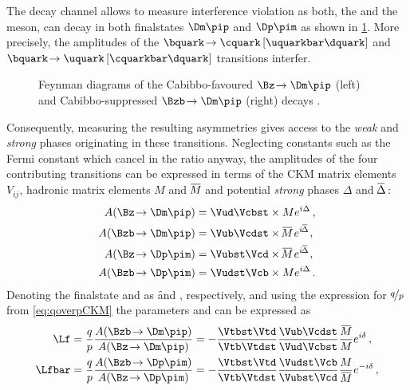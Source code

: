 The decay channel \BdToDpi allows to measure interference \CP violation as both, the \Bz and the \Bzb meson, can decay in both finalstates $\Dm\pip$ and $\Dp\pim$ as shown in \cref{fig:feynmanBd2Dpi}.
More precisely, the amplitudes of the $\bquark\!\to\cquark\left[\uquarkbar\dquark\right]$ and $\bquark\!\to\uquark\left[\cquarkbar\dquark\right]$ transitions interfer.
\begin{figure}[tbp]
	\centering
	
	
	\caption{Feynman diagrams of the Cabibbo-favoured $\Bz\!\to\Dm\pip$ (left) and Cabibbo-suppressed $\Bzb\!\to\Dm\pip$ (right) decays \cite{Ellis:2016jkw}.}
	\label{fig:feynmanBd2Dpi}
\end{figure}
Consequently, measuring the resulting \CP asymmetries gives access to the \emph{weak} and \emph{strong} phases originating in these transitions.
Neglecting constants such as the Fermi constant which cancel in the ratio anyway, the amplitudes of the four contributing transitions can be expressed in terms of the CKM matrix elements $V_{ij}^{\phantom{\ast}}$, hadronic matrix elements $M$ and $\overline{\kern -1.0pt M\kern -1.0pt}$ and potential \emph{strong} phases $\Delta$ and $\overline{\kern -1.0pt \Delta\kern -1.0pt}\,$:
\begin{align}
A\!\left(\Bz\!\to\Dm\pip\right)&=\Vud\Vcbst\times Me^{i\Delta}\,,\\
A\!\left(\Bzb\!\to\Dm\pip\right)&=\Vub\Vcdst\times \overline{\kern -1.0pt M\kern -1.0pt}\,e^{i\overline{\kern -1.0pt \Delta\kern -1.0pt}}\,,\\
A\!\left(\Bz\!\to\Dp\pim\right)&=\Vubst\Vcd\times \overline{\kern -1.0pt M\kern -1.0pt}\,e^{i\overline{\kern -1.0pt \Delta\kern -1.0pt}}\,,\\
A\!\left(\Bzb\!\to\Dp\pim\right)&=\Vudst\Vcb\times Me^{i\Delta}\,.
\end{align}
Denoting the finalstate \Dm\pip and \Dp\pim as \f and \fbar, respectively, and using the expression for $\nicefrac{q}{p}$ from \cref{eq:qoverpCKM} the parameters \Lf and \Lfbar can be expressed as
\begin{align}
\Lf&=\frac{q}{p}\frac{A\!\left(\Bzb\!\to\Dm\pip\right)}{A\!\left(\Bz\!\to\Dm\pip\right)}=-\frac{\Vtbst\Vtd}{\Vtb\Vtdst}\frac{\Vub\Vcdst}{\Vud\Vcbst}\frac{\overline{\kern -1.0pt M\kern -1.0pt}}{M}e^{i\delta}\,,\\
\Lfbar&=\frac{q}{p}\frac{A\!\left(\Bzb\!\to\Dp\pim\right)}{A\!\left(\Bz\!\to\Dp\pim\right)}=-\frac{\Vtbst\Vtd}{\Vtb\Vtdst}\frac{\Vudst\Vcb}{\Vubst\Vcd}\frac{M}{\overline{\kern -1.0pt M\kern -1.0pt}}e^{-i\delta}\,,
\end{align}
